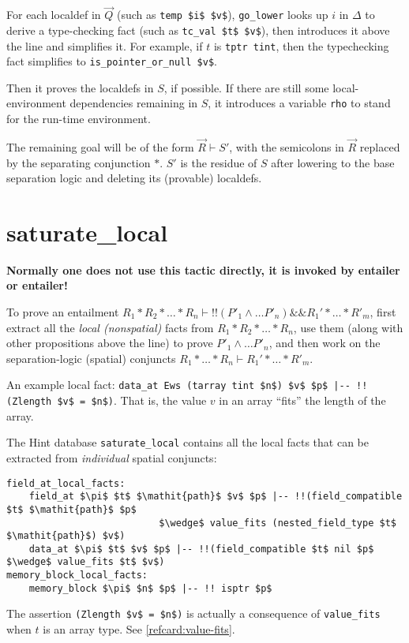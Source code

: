 \documentclass[12pt,fleqn,openany,oneside,showtrims]{memoir}
\begin{document}
For each localdef in $\vec{Q}$ (such as \lstinline{temp $i$ $v$}),
\lstinline{go_lower} looks up $i$ in $\Delta$ to derive a type-checking fact
(such as \lstinline{tc_val $t$ $v$}),
then introduces it above the line and simplifies it.  For example, if $t$ is \lstinline{tptr tint}, then the typechecking fact simplifies to \lstinline{is_pointer_or_null $v$}.

Then it proves the localdefs in $S$, if possible.  If there are still some
  local-environment dependencies remaining in $S$, it introduces a variable
  \lstinline{rho} to stand for the run-time environment.

The remaining goal will be of the form
$\vec{R} \vdash S'$, with the semicolons in $\vec{R}$
replaced by the separating conjunction $*$.
$S'$ is the residue of $S$ after
lowering to the base separation logic and
deleting its (provable) localdefs.


\chapter{saturate\_local}
\label{refcard:saturate-local}
\textbf{Normally one does not use this tactic directly,
  it is invoked by \textsf{entailer} or \textsf{entailer!}}

To prove an entailment $R_1*R_2*\ldots*R_n \vdash
!!(P'_1 \wedge \ldots P'_n) \&\& R_1'*\ldots*R'_m$,
first extract all the \emph{local (nonspatial)} facts from
$R_1*R_2*\ldots*R_n$, use them (along with other propositions
above the line) to prove $P'_1 \wedge \ldots P'_n$,
and then work on the separation-logic (spatial) conjuncts
$R_1*\ldots*R_n \vdash R_1'*\ldots*R'_m$.

An example local fact:
\lstinline{data_at Ews (tarray tint $n$) $v$ $p$ |-- !! (Zlength $v$ = $n$)}.
That is, the value $v$ in an array ``fits'' the length of the array.

The Hint database \lstinline{saturate_local} contains all the
local facts that can be extracted from \emph{individual} spatial conjuncts:
\begin{lstlisting}
field_at_local_facts:
    field_at $\pi$ $t$ $\mathit{path}$ $v$ $p$ |-- !!(field_compatible $t$ $\mathit{path}$ $p$
                           $\wedge$ value_fits (nested_field_type $t$ $\mathit{path}$) $v$)
    data_at $\pi$ $t$ $v$ $p$ |-- !!(field_compatible $t$ nil $p$ $\wedge$ value_fits $t$ $v$)
memory_block_local_facts:
    memory_block $\pi$ $n$ $p$ |-- !! isptr $p$
\end{lstlisting}
The assertion \lstinline{(Zlength $v$ = $n$)} is actually a consequence
of \lstinline{value_fits} when $t$ is an array type.
See \autoref{refcard:value-fits}.
\end{document}

